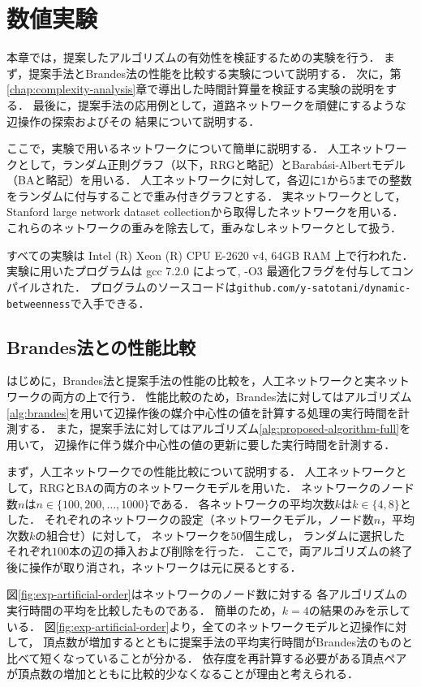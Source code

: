 \chapter{数値実験}
\label{chap:experiment}

本章では，提案したアルゴリズムの有効性を検証するための実験を行う．
まず，提案手法とBrandes法の性能を比較する実験について説明する．
次に，第\ref{chap:complexity-analysis}章で導出した時間計算量を検証する実験の説明をする．
最後に，提案手法の応用例として，道路ネットワークを頑健にするような辺操作の探索およびその
結果について説明する．

ここで，実験で用いるネットワークについて簡単に説明する．
人工ネットワークとして，ランダム正則グラフ（以下，RRGと略記）とBarab{\'{a}}si-Albertモデル（BAと略記）を用いる．
人工ネットワークに対して，各辺に$1$から$5$までの整数をランダムに付与することで重み付きグラフとする．
実ネットワークとして，Stanford large network dataset collection\cite{Leskovec2016}から取得したネットワークを用いる．
これらのネットワークの重みを除去して，重みなしネットワークとして扱う．

すべての実験は Intel (R) Xeon (R) CPU E-2620 v4, 64GB RAM 上で行われた．
実験に用いたプログラムは gcc 7.2.0 によって, -O3 最適化フラグを付与してコンパイルされた．
プログラムのソースコードは\verb|github.com/y-satotani/dynamic-betweenness|で入手できる．

\section{Brandes法との性能比較}
はじめに，Brandes法と提案手法の性能の比較を，人工ネットワークと実ネットワークの両方の上で行う．
性能比較のため，Brandes法に対してはアルゴリズム\ref{alg:brandes}を用いて辺操作後の媒介中心性の値を計算する処理の実行時間を計測する．
また，提案手法に対してはアルゴリズム\ref{alg:proposed-algorithm-full}を用いて，
辺操作に伴う媒介中心性の値の更新に要した実行時間を計測する．

まず，人工ネットワークでの性能比較について説明する．
人工ネットワークとして，RRGとBAの両方のネットワークモデルを用いた．
ネットワークのノード数$n$は$n\in\{100,200,\ldots,1000\}$である．
各ネットワークの平均次数$k$は$k\in\{4,8\}$とした．
それぞれのネットワークの設定（ネットワークモデル，ノード数$n$，平均次数$k$の組合せ）に対して，
ネットワークを$50$個生成し，
ランダムに選択したそれぞれ$100$本の辺の挿入および削除を行った．
ここで，両アルゴリズムの終了後に操作が取り消され，ネットワークは元に戻るとする．

図\ref{fig:exp-artificial-order}はネットワークのノード数に対する
各アルゴリズムの実行時間の平均を比較したものである．
簡単のため，$k=4$の結果のみを示している．
図\ref{fig:exp-artificial-order}より，全てのネットワークモデルと辺操作に対して，
頂点数が増加するとともに提案手法の平均実行時間がBrandes法のものと比べて短くなっていることが分かる．
依存度を再計算する必要がある頂点ペアが頂点数の増加とともに比較的少なくなることが理由と考えられる．

